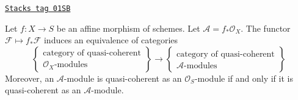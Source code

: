\begin{lemma}
\label{morphisms-lemma-affine-equivalence-modules}
\href{https://stacks.math.columbia.edu/tag/01SB}{\texttt{Stacks tag 01SB}}

Let $f : X \to S$ be an affine morphism of schemes.
Let $\mathcal{A} = f_*\mathcal{O}_X$.
The functor $\mathcal{F} \mapsto f_*\mathcal{F}$ induces
an equivalence of categories
$$
\left\{
\begin{matrix}
\text{category of quasi-coherent}\\
\mathcal{O}_X\text{-modules}
\end{matrix}
\right\}
\longrightarrow
\left\{
\begin{matrix}
\text{category of quasi-coherent}\\
\mathcal{A}\text{-modules}
\end{matrix}
\right\}
$$
Moreover, an $\mathcal{A}$-module is
quasi-coherent as an $\mathcal{O}_S$-module if and only if
it is quasi-coherent as an $\mathcal{A}$-module.
\end{lemma}

